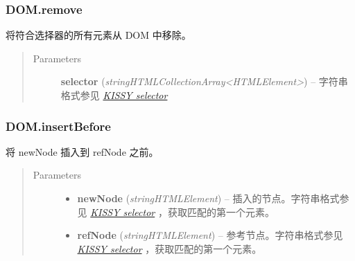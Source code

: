 \documentclass[letterpaper,10pt,english]{sphinxmanual}
\begin{document}
\subsubsection{DOM.remove}
\label{api/core/dom/remove::doc}\label{api/core/dom/remove:dom-remove}

\begin{fulllineitems}
\label{api/core/dom/remove:DOM.remove}
将符合选择器的所有元素从 DOM 中移除。
\begin{quote}\begin{description}
\item[{Parameters}] \leavevmode
\textbf{selector} (\emph{string\textbar{}HTMLCollection\textbar{}Array\textless{}HTMLElement\textgreater{}}) -- 字符串格式参见 {\hyperref[api/core/dom/selector:dom-selector]{\emph{KISSY selector}}}

\end{description}\end{quote}

\end{fulllineitems}



\subsubsection{DOM.insertBefore}
\label{api/core/dom/insertBefore::doc}\label{api/core/dom/insertBefore:dom-insertbefore}

\begin{fulllineitems}
\label{api/core/dom/insertBefore:DOM.insertBefore}
将 newNode 插入到 refNode 之前。
\begin{quote}\begin{description}
\item[{Parameters}] \leavevmode\begin{itemize}
\item {}
\textbf{newNode} (\emph{string\textbar{}HTMLElement}) -- 插入的节点。字符串格式参见 {\hyperref[api/core/dom/selector:dom-selector]{\emph{KISSY selector}}} ，获取匹配的第一个元素。

\item {}
\textbf{refNode} (\emph{string\textbar{}HTMLElement}) -- 参考节点。字符串格式参见 {\hyperref[api/core/dom/selector:dom-selector]{\emph{KISSY selector}}} ，获取匹配的第一个元素。

\end{itemize}

\end{description}\end{quote}

\end{fulllineitems}
\end{document}
